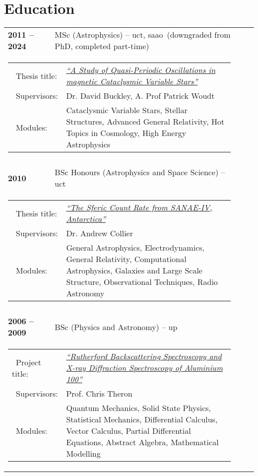 \documentclass{article}
\newcommand{\homeURL}{http://www.saao.ac.za/~hannes}
\newcommand{\thesesURL}{\homeURL/theses}
\newcommand{\itm}[1]{\textbf{#1}}
\newcommand{\tb}{\textbullet}
\newcommand{\uct}{\gls*{uct}\xspace}
\newcommand{\saao}{\gls*{saao}\xspace}
\begin{document}
\section{Education}
\begin{longtable}{lll}
  \itm{2011 -- 2024}   & MSc (Astrophysics) -- \uct, \saao\ (downgraded from PhD, completed part-time) \\
    \multicolumn{3}{c}{\parbox{0.95\textwidth}{
      \begin{tabular}{p{0.175\linewidth}p{0.75\linewidth}}
        \tb\ Thesis title:   & 
          \href{\thesesURL/msc/main.pdf}
              {\emph{``A Study of Quasi-Periodic Oscillations in
                       magnetic Cataclysmic Variable Stars''}} \\
        \tb\ Supervisors:    & Dr. David Buckley, A. Prof Patrick Woudt \\
        \tb\ Modules:        & 
          Cataclysmic Variable Stars, Stellar Structures, Advanced General
          Relativity, Hot Topics in Cosmology, High Energy Astrophysics \\ 
      \end{tabular} }}
  \\ \\

  \itm{2010}     & BSc Honours (Astrophysics and Space Science) -- \uct\ \\
    \multicolumn{3}{c}{\parbox{0.95\textwidth}{
      \begin{tabular}{p{0.175\linewidth}p{0.75\linewidth}}
        \tb\ Thesis title:  & 
          \href{\thesesURL/2010NASSPHons_Sferics.pdf}
                {\emph{``The Sferic Count Rate from SANAE-IV, Antarctica''}} \\
        \tb\ Supervisors:   & Dr. Andrew Collier  \\
        \tb\ Modules:       &
          General Astrophysics, Electrodynamics, General Relativity, Computational
          Astrophysics, Galaxies and Large Scale Structure, Observational
          Techniques, Radio Astronomy\\ 
      \end{tabular} }}
  \\ \\

  \itm{2006 -- 2009}     & BSc (Physics and Astronomy) -- \gls*{up}\\ %
    \multicolumn{3}{c}{\parbox{0.95\textwidth}{
      \begin{tabular}{p{0.175\linewidth}p{0.75\linewidth}}
        \tb\ Project title:  & 
          \href{\thesesURL/2009BSc_Al100.pdf}
               {\emph{``Rutherford Backscattering Spectroscopy and X-ray Diffraction
                        Spectroscopy of Aluminium 100''}} \\
        \tb\ Supervisors:    & Prof. Chris Theron\\
        \tb\ Modules:        & 
          Quantum Mechanics, Solid State Physics, Statistical Mechanics,
          Differential Calculus, Vector Calculus, Partial Differential Equations,
          Abstract Algebra, Mathematical Modelling\\


\end{tabular}}}
\end{longtable}
\end{document}
